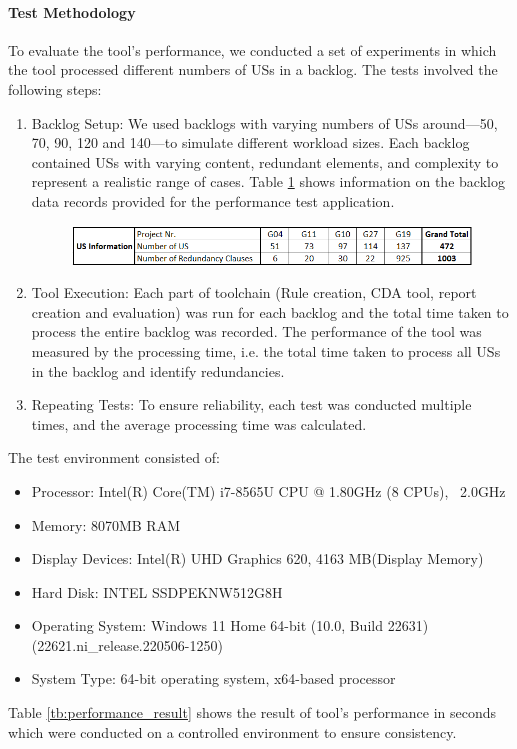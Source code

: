 \paragraph{Test Methodology}To evaluate the tool's performance, we conducted a set of experiments in which the tool processed different numbers of USs in a backlog. The tests involved the following steps:
\begin{enumerate}
	\item Backlog Setup: We used backlogs with varying numbers of USs around—50, 70, 90, 120 and 140—to simulate different workload sizes. Each backlog contained USs with varying content, redundant elements, and complexity to represent a realistic range of cases. Table \ref{tb:performance_env} shows information on the backlog data records provided for the performance test application.
	\begin{figure}[h]
		\begingroup
		\scriptsize
		\centering
		\includegraphics[scale=0.7]{Table/performance_env.png}
		\label{tb:performance_env}
		\endgroup
	\end{figure}
	\item Tool Execution: Each part of toolchain (Rule creation, CDA tool, report creation and evaluation) was run for each backlog and the total time taken to process the entire backlog was recorded. The performance of the tool was measured by the processing time, i.e. the total time taken to process all USs in the backlog and identify redundancies.
	
	\item Repeating Tests: To ensure reliability, each test was conducted multiple times, and the average processing time was calculated.
\end{enumerate}
The test environment consisted of:
\begin{itemize}
	\item Processor: Intel(R) Core(TM) i7-8565U CPU @ 1.80GHz (8 CPUs), ~2.0GHz		
	\item Memory: 8070MB RAM
	\item Display Devices: Intel(R) UHD Graphics 620, 4163 MB(Display Memory)
	\item Hard Disk: INTEL SSDPEKNW512G8H
	\item Operating System: Windows 11 Home 64-bit (10.0, Build 22631) (22621.ni\_release.220506-1250)
	\item System Type: 64-bit operating system, x64-based processor
\end{itemize}
Table \ref{tb:performance_result} shows the result of tool's performance in seconds which were conducted on a controlled environment to ensure consistency.

